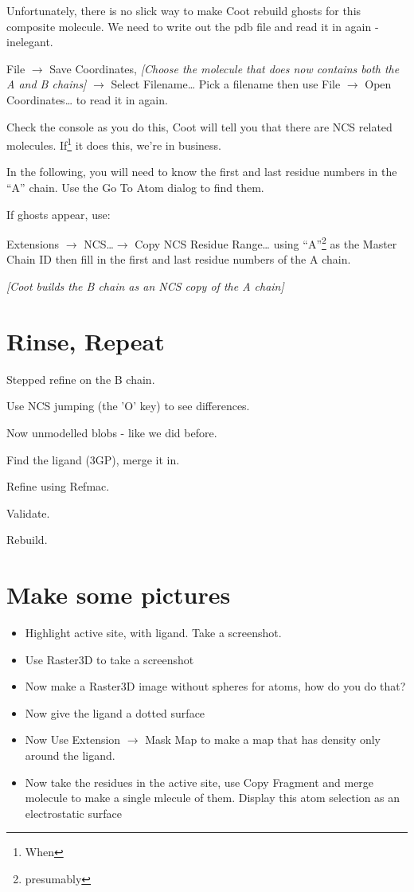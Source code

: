 \documentclass{article}
\begin{document}
Unfortunately, there is no slick way to make Coot rebuild ghosts for
this composite molecule.  We need to write out the pdb file and read
it in again - inelegant.

\textsf{File $\rightarrow$ Save Coordinates, \emph{[Choose the
    molecule that does now contains both the A and B chains]}
  $\rightarrow$ Select Filename\ldots } Pick a filename then use
\textsf{File $\rightarrow$ Open Coordinates\ldots} to read it in
again.

Check the console as you do this, Coot will tell you that there are
NCS related molecules.  If\footnote{When} it does this, we're in
business.

In the following, you will need to know the first and last residue
numbers in the ``A'' chain.  Use the Go To Atom dialog to find them.

If ghosts appear, use:

\textsf{Extensions $\rightarrow$ NCS\ldots $\rightarrow$ Copy NCS
  Residue Range\ldots} using ``A''\footnote{presumably} as the Master
Chain ID then fill in the first and last residue numbers of the A
chain.

\textsl{[Coot builds the B chain as an NCS copy of the A chain]}

\section{Rinse, Repeat}

\begin{trivlist}
\item Stepped refine on the B chain.

  Use NCS jumping (the 'O' key) to see differences.
\item Now unmodelled blobs - like we did before.
\item Find the ligand (3GP), merge it in.
\item Refine using Refmac.
\item Validate. 
\item Rebuild.
\end{trivlist}


\section{Make some pictures}


  \begin{itemize}
    \item Highlight active site, with ligand.  Take a screenshot.
    \item Use Raster3D to take a screenshot
    \item Now make a Raster3D image without spheres for atoms, how do
      you do that?
    \item Now give the ligand a dotted surface
    \item Now Use \textsf{Extension $\rightarrow$ Mask Map} to make a
      map that has density only around the ligand.
    \item Now take the residues in the active site, use Copy Fragment
      and merge molecule to make a single mlecule of them. Display
      this atom selection as an electrostatic surface
  \end{itemize}
\end{document}
